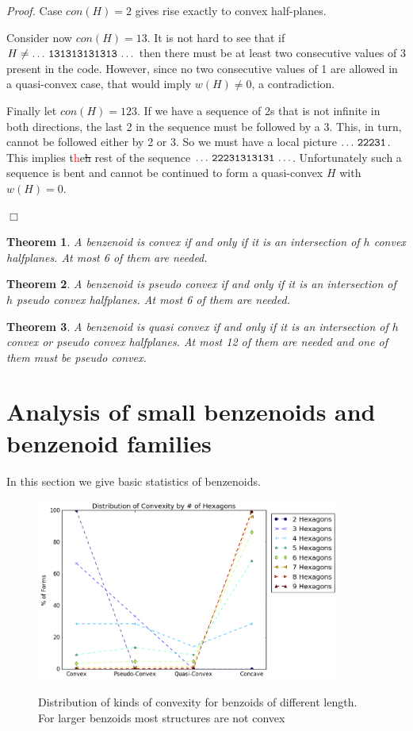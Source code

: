 \documentclass[a4paper,10pt]{article}
\newcounter{theorem}
\newtheorem{theorem}{Theorem}[section]
\newenvironment{proof}{\medskip\emph{Proof.}}{\hfill$\Box$\medskip}
\newcommand\TODO[1]{\textcolor{red}{#1}}
\begin{document}
{\begin{proof}
Case $con(H) = 2$ gives rise exactly to convex half-planes.

Consider now $con(H) = 13$. It is not hard to see that if $H \neq {\tt \ldots\,131313131313\,\ldots}$ then there must be at least two consecutive values of 3 present in the code. However, since no two consecutive values of 1 are allowed in a quasi-convex case, that would imply $w(H) \neq 0$, a contradiction.

Finally let $con(H) = 123$. If we have a sequence of 2s that is not infinite in both directions, the last 2 in the sequence must be followed by a 3. This, in turn, cannot be followed either by 2 or 3. So we must have a local picture ${\tt \ldots\,22231}$. This implies t\TODO{h}e\sout{h} rest of the sequence 
${\tt \ldots\,22231313131\,\ldots}$. Unfortunately such a sequence is bent
and cannot be continued to form a quasi-convex $H$ with $w(H) = 0$.

 
\end{proof}



\begin{theorem}
A benzenoid is convex if and only if it is an intersection of $h$ convex halfplanes. At most 6 of them
are needed.
\end{theorem}

\begin{theorem}
A benzenoid is pseudo convex if and only if it is an intersection of $h$ pseudo convex halfplanes. At most 6 of them are needed.
\end{theorem}

\begin{theorem}
A benzenoid is quasi convex if and only if it is an intersection of $h$ convex or pseudo convex halfplanes. 
At most 12 of them are needed and one of them must be pseudo convex.
\end{theorem}


\section{Analysis of small benzenoids and benzenoid families}

In this section we give basic statistics of benzenoids.


\begin{figure}
\centering
 \includegraphics[width=100mm]{figures/distribution_of_convexity.png}
 \label{fig_convex}
 \caption{Distribution of kinds of convexity for benzoids of different length. For larger benzoids most structures are not convex}
\end{figure}

}
\end{document}
